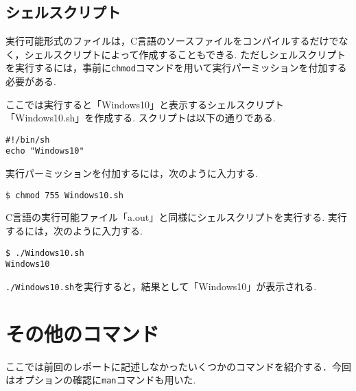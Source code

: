 \documentclass[a4j,11pt]{jarticle}
\begin{document}
\subsection{シェルスクリプト}
実行可能形式のファイルは，C言語のソースファイルをコンパイルするだけでなく，シェルスクリプトによって作成することもできる.
ただしシェルスクリプトを実行するには，事前に\verb|chmod|コマンドを用いて実行パーミッションを付加する必要がある.

ここでは実行すると「Windows10」と表示するシェルスクリプト「Windows10.sh」を作成する.
スクリプトは以下の通りである.
\begin{verbatim}
#!/bin/sh
echo "Windows10"
\end{verbatim}
実行パーミッションを付加するには，次のように入力する.
\begin{verbatim}
$ chmod 755 Windows10.sh
\end{verbatim}
C言語の実行可能ファイル「a.out」と同様にシェルスクリプトを実行する.
実行するには，次のように入力する.
\begin{verbatim}
$ ./Windows10.sh
Windows10
\end{verbatim}
\verb|./Windows10.sh|を実行すると，結果として「Windows10」が表示される.

\section{その他のコマンド}
ここでは前回のレポートに記述しなかったいくつかのコマンドを紹介する．今回はオプションの確認に\verb|man|コマンドも用いた.
\end{document}
